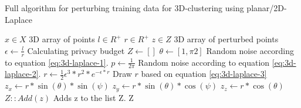 \begin{algorithm}[H]
  \caption{Full algorithm for perturbing training data for 3D-clustering using planar/2D-Laplace \citep{DBLP:journals/corr/abs-1212-1984}}\label{alg:rq1}
  \begin{algorithmic}
    \Require $x \in X$  \Comment 3D array of points
    \Require $l \in R^ +$
    \Require $r \in R^ +$
    \Ensure $z \in Z$ \Comment 3D array of perturbed points
    \State $\epsilon \gets \frac{l}{r}$ \Comment Calculating privacy budget \citep{DBLP:journals/corr/abs-1212-1984}
    \State $Z \gets []$
    \State $\theta \gets [1, \pi2]$       \Comment Random noise according to equation \ref{eq:3d-laplace-1}.
    \State $p \gets \frac{1}{2\pi}$     \Comment Random noise according to equation \ref{eq:3d-laplace-2}.
    \State $r \gets \frac{1}{2}\epsilon^3 * r^2 * e^{-\epsilon * r}$          \Comment Draw $r$ based on equation \ref{eq:3d-laplace-3}
    \State $z_x \gets r * \sin(\theta) * \sin(\psi)$
    \State $z_y \gets r * \sin(\theta) * \cos(\psi)$
    \State $z_z \gets r * \cos(\theta)$
    \State $Z::Add(z)$                      \Comment Adds z to the list Z.
    \EndFor
    \State \Return Z
  \end{algorithmic}
  \label{alg:3d-laplace}
\end{algorithm}